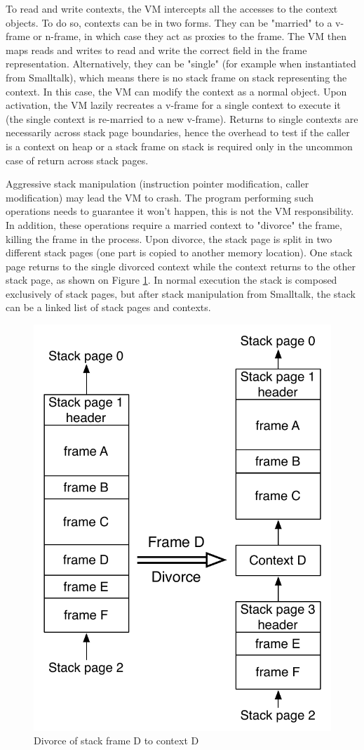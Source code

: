 \documentclass[a4paper,12pt,twoside]{../includes/ThesisStyle}
\begin{document}
To read and write contexts, the VM intercepts all the accesses to the context objects. To do so, contexts can be in two forms. They can be "married" to a v-frame or n-frame, in which case they act as proxies to the frame. The VM then maps reads and writes to read and write the correct field in the frame representation. Alternatively, they can be "single" (for example when instantiated from Smalltalk), which means there is no stack frame on stack representing the context. In this case, the VM can modify the context as a normal object. Upon activation, the VM lazily recreates a v-frame for a single context to execute it (the single context is re-married to a new v-frame). Returns to single contexts are necessarily across stack page boundaries, hence the overhead to test if the caller is a context on heap or a stack frame on stack is required only in the uncommon case of return across stack pages. 

Aggressive stack manipulation (instruction pointer modification, caller modification) may lead the VM to crash. The program performing such operations needs to guarantee it won't happen, this is not the VM responsibility. In addition, these operations require a married context to "divorce" the frame, killing the frame in the process. Upon divorce, the stack page is split in two different stack pages (one part is copied to another memory location). One stack page returns to the single divorced context while the context returns to the other stack page, as shown on Figure \ref{fig:Divorce}. In normal execution the stack is composed exclusively of stack pages, but after stack manipulation from Smalltalk, the stack can be a linked list of stack pages and contexts. 

\begin{figure}[h!]
    \begin{center}
        \includegraphics[width=0.55\linewidth]{Divorce}
        \caption{Divorce of stack frame D to context D}
        \label{fig:Divorce}
    \end{center}
\end{figure}
\end{document}
